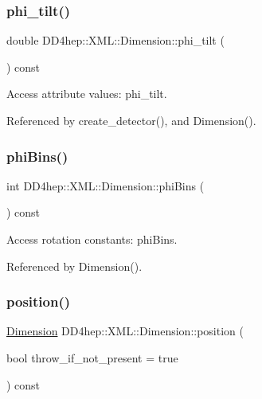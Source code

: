 \subsubsection{\texorpdfstring{phi\+\_\+tilt()}{phi\_tilt()}}
{\footnotesize\ttfamily double D\+D4hep\+::\+X\+M\+L\+::\+Dimension\+::phi\+\_\+tilt (\begin{DoxyParamCaption}{ }\end{DoxyParamCaption}) const}



Access attribute values\+: phi\+\_\+tilt. 



Referenced by create\+\_\+detector(), and Dimension().

\hypertarget{struct_d_d4hep_1_1_x_m_l_1_1_dimension_a362307eb0c24e97c0ab42af955a0d12c}{}\label{struct_d_d4hep_1_1_x_m_l_1_1_dimension_a362307eb0c24e97c0ab42af955a0d12c} 
\subsubsection{\texorpdfstring{phi\+Bins()}{phiBins()}}
{\footnotesize\ttfamily int D\+D4hep\+::\+X\+M\+L\+::\+Dimension\+::phi\+Bins (\begin{DoxyParamCaption}{ }\end{DoxyParamCaption}) const}



Access rotation constants\+: phi\+Bins. 



Referenced by Dimension().

\hypertarget{struct_d_d4hep_1_1_x_m_l_1_1_dimension_abcca29a6b0483f52be66f7084e4d71d2}{}\label{struct_d_d4hep_1_1_x_m_l_1_1_dimension_abcca29a6b0483f52be66f7084e4d71d2} 
\subsubsection{\texorpdfstring{position()}{position()}}
{\footnotesize\ttfamily \hyperlink{struct_d_d4hep_1_1_x_m_l_1_1_dimension}{Dimension} D\+D4hep\+::\+X\+M\+L\+::\+Dimension\+::position (\begin{DoxyParamCaption}\item[{bool}]{throw\+\_\+if\+\_\+not\+\_\+present = {\ttfamily true} }\end{DoxyParamCaption}) const}



